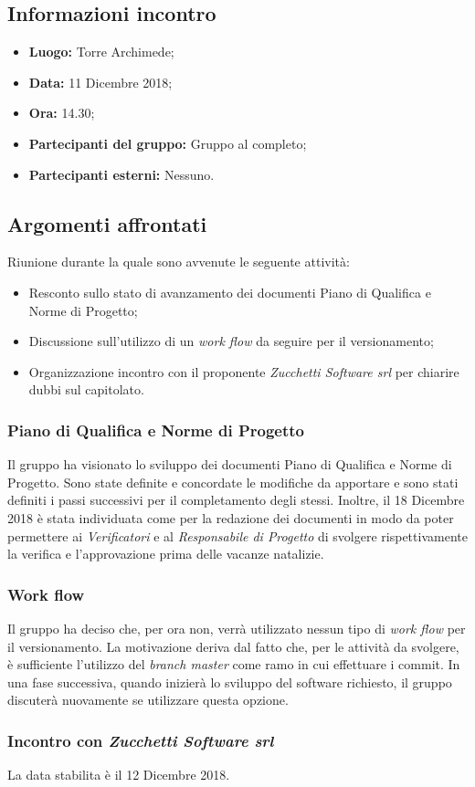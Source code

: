 \subsection{Informazioni incontro}
\begin{itemize}
	\item { \textbf{Luogo:} Torre Archimede;  }
	\item { \textbf{Data:} 11 Dicembre 2018; }
	\item { \textbf{Ora:} 14.30; }
	\item { \textbf{Partecipanti del gruppo:} Gruppo al completo; }
	\item { \textbf{Partecipanti esterni:} Nessuno. }
\end{itemize}


\subsection{Argomenti affrontati}
Riunione durante la quale sono avvenute le seguente attività:
\begin{itemize}
	\item{Resconto sullo stato di avanzamento dei documenti Piano di Qualifica e Norme di Progetto; }
	\item{Discussione sull'utilizzo di un \emph{work flow} da seguire per il versionamento;}
	\item{Organizzazione incontro con il proponente \emph{Zucchetti Software srl} per chiarire dubbi sul capitolato. }
\end{itemize}

\subsubsection{Piano di Qualifica e Norme di Progetto}
Il gruppo ha visionato lo sviluppo dei documenti Piano di Qualifica e Norme di Progetto. Sono state definite e concordate le modifiche da apportare e sono stati definiti i passi successivi per il completamento degli stessi. Inoltre, il 18 Dicembre 2018 è stata individuata come  per la redazione dei documenti in modo da poter permettere ai \emph{Verificatori} e al \emph{Responsabile di Progetto} di svolgere rispettivamente la verifica e l'approvazione prima delle vacanze natalizie.

\subsubsection{Work flow}
Il gruppo ha deciso che, per ora non, verrà utilizzato nessun tipo di \emph{work flow} per il versionamento. La motivazione deriva dal fatto che, per le attività da svolgere, è sufficiente l'utilizzo del \emph{branch master} come ramo in cui effettuare i commit. In una fase successiva, quando inizierà lo sviluppo del software richiesto, il gruppo discuterà nuovamente se utilizzare questa opzione.

\subsubsection{Incontro con \emph{Zucchetti Software srl}}
La data stabilita è il 12 Dicembre 2018.